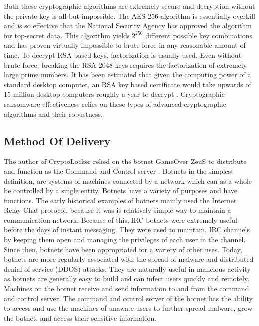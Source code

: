 \documentclass[11.5pt]{article}
\begin{document}
Both these cryptographic algorithms are extremely secure and decryption without the private key is all but impossible.  The AES-256 algorithm is essentially overkill and is so effective that the National Security Agency has approved the algorithm for top-secret data.  This algorithm yields $2^{256}$ different possible key combinations and has proven virtually impossible to brute force in any reasonable amount of time. To decrypt RSA based keys, factorization is usually used.  Even without brute force, breaking the RSA-2048 keys requires the factorization of extremely large prime numbers.  It has been estimated that given the computing power of a standard desktop computer, an RSA key based certificate would take upwards of 15 million desktop computers roughly a year to decrypt \cite{digicert}.  Cryptographic ransomware effectiveness relies on these types of advanced cryptographic algorithms and their robustness. 

\subsection{Method Of Delivery}

The author of CryptoLocker relied on the botnet GameOver ZeuS to distribute and function as the Command and Control server \cite{tovar}. Botnets in the simplest definition, are systems of machines connected by a network which can as a whole be controlled by a single entity.  Botnets have a variety of purposes and have functions.   The early historical examples of botnets mainly used the Internet Relay Chat protocol, because it was is relatively simple way to maintain a communication network.  Because of this, IRC botnets were extremely useful before the days of instant messaging.   They were used to maintain, IRC channels by keeping them open and managing the privileges of each user in the channel.  \\

Since then, botnets have been appropriated for a variety of other uses.  Today, botnets are more regularly associated with the spread of malware and distributed denial of service (DDOS) attacks.  They are naturally useful in malicious activity as botnets are generally easy to build and can infect users quickly and remotely.  Machines on the botnet receive and send information to and from the command and control server.  The command and control server of the botnet has the ability to access and use the machines of unaware users to further spread malware, grow the botnet, and access their sensitive information. \\
\end{document}
